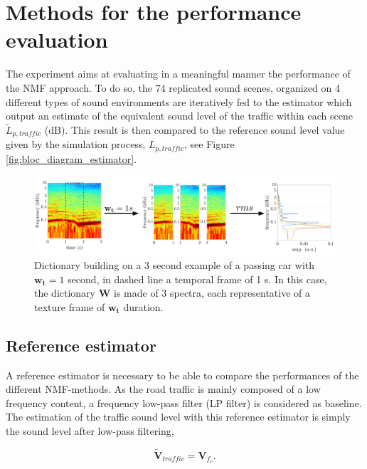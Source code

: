 \documentclass[review,5p,twocolumn,sort&compress,times]{elsarticle}
\begin{document}
\section{Methods for the performance evaluation}\label{part:expProtocol}

The experiment aims at evaluating in a meaningful manner the performance of the NMF approach. To do so, the 74 replicated sound scenes, organized on 4 different types of sound environments are iteratively fed to the estimator which output an estimate of the equivalent sound level of the traffic within each scene $\tilde{L}_{p, traffic}$ (dB). This result is then compared to the reference sound level value given by the simulation process, $L_{p,traffic}$, see Figure \ref{fig:bloc_diagram_estimator}.



\begin{figure}[t]
\centering
\includegraphics[width=\linewidth]{figures/extractionDictionary3.pdf}
\caption{Dictionary building on a 3 second example of a passing car with $\mathbf{w_t} = 1$ second, in dashed line a temporal frame of 1 s. In this case, the dictionary $\mathbf{W}$ is made of 3 spectra, each representative of a texture frame of $\mathbf{w_t}$ duration.}
\label{fig:example_dictionary}
\end{figure}

\subsection{Reference estimator}

A reference estimator is necessary to be able to compare the performances of the different NMF-methods. As the road traffic is mainly composed of a low frequency content, a frequency low-pass filter (LP filter) is considered as baseline. The estimation of the traffic sound level with this reference estimator is simply the sound level after low-pass filtering, 

\begin{equation}
\mathbf{\tilde{V}}_{traffic} = \mathbf{V}_{f_c}.
\end{equation}
\end{document}
